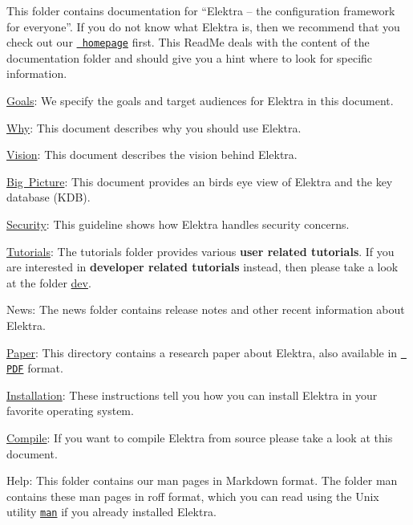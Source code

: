 This folder contains documentation for “\+Elektra – the configuration framework for everyone”. If you do not know what Elektra is, then we recommend that you check out our \href{https://www.libelektra.org/home}{\texttt{ homepage}} first. This Read\+Me deals with the content of the documentation folder and should give you a hint where to look for specific information.


\begin{DoxyItemize}
\item \mbox{\hyperlink{doc_GOALS_md}{Goals}}\+: We specify the goals and target audiences for Elektra in this document.
\item \mbox{\hyperlink{doc_WHY_md}{Why}}\+: This document describes why you should use Elektra.
\item \mbox{\hyperlink{doc_VISION_md}{Vision}}\+: This document describes the vision behind Elektra.
\item \mbox{\hyperlink{doc_BIGPICTURE_md}{Big Picture}}\+: This document provides an birds eye view of Elektra and the key database (K\+DB).
\item \mbox{\hyperlink{doc_SECURITY_md}{Security}}\+: This guideline shows how Elektra handles security concerns.
\item \mbox{\hyperlink{md_doc_tutorials_README_doc_tutorials_README_md}{Tutorials}}\+: The tutorials folder provides various {\bfseries{user related tutorials}}. If you are interested in {\bfseries{developer related tutorials}} instead, then please take a look at the folder \mbox{\hyperlink{md_doc_dev_README_doc_dev_README_md}{dev}}.
\item News\+: The news folder contains release notes and other recent information about Elektra.
\item \mbox{\hyperlink{doc_paper_README_md}{Paper}}\+: This directory contains a research paper about Elektra, also available in \href{http://joss.theoj.org/papers/10.21105/joss.00044}{\texttt{ P\+DF}} format.
\end{DoxyItemize}


\begin{DoxyItemize}
\item \mbox{\hyperlink{doc_INSTALL_md}{Installation}}\+: These instructions tell you how you can install Elektra in your favorite operating system.
\item \mbox{\hyperlink{doc_COMPILE_md}{Compile}}\+: If you want to compile Elektra from source please take a look at this document.
\item Help\+: This folder contains our man pages in Markdown format. The folder man contains these man pages in roff format, which you can read using the Unix utility \href{https://en.wikipedia.org/wiki/Man_page}{\texttt{ {\ttfamily man}}} if you already installed Elektra.
\end{DoxyItemize}


